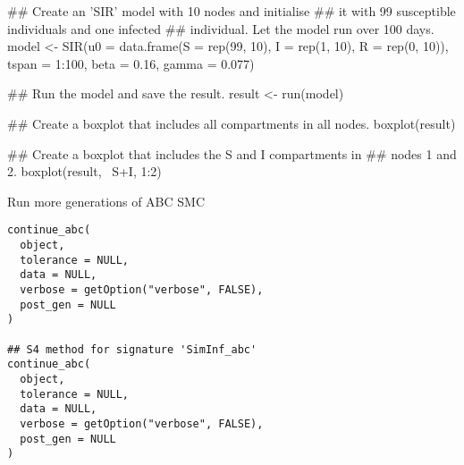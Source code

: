 \documentclass[letterpaper]{book}
\begin{document}
%
\begin{Examples}
\begin{ExampleCode}
## Create an 'SIR' model with 10 nodes and initialise
## it with 99 susceptible individuals and one infected
## individual. Let the model run over 100 days.
model <- SIR(u0 = data.frame(S = rep(99, 10),
                             I = rep(1, 10),
                             R = rep(0, 10)),
             tspan = 1:100,
             beta = 0.16,
             gamma = 0.077)

## Run the model and save the result.
result <- run(model)

## Create a boxplot that includes all compartments in all nodes.
boxplot(result)

## Create a boxplot that includes the S and I compartments in
## nodes 1 and 2.
boxplot(result, ~S+I, 1:2)
\end{ExampleCode}
\end{Examples}
%
\begin{Description}
Run more generations of ABC SMC
\end{Description}
%
\begin{Usage}
\begin{verbatim}
continue_abc(
  object,
  tolerance = NULL,
  data = NULL,
  verbose = getOption("verbose", FALSE),
  post_gen = NULL
)

## S4 method for signature 'SimInf_abc'
continue_abc(
  object,
  tolerance = NULL,
  data = NULL,
  verbose = getOption("verbose", FALSE),
  post_gen = NULL
)
\end{verbatim}
\end{Usage}
%
\end{document}
